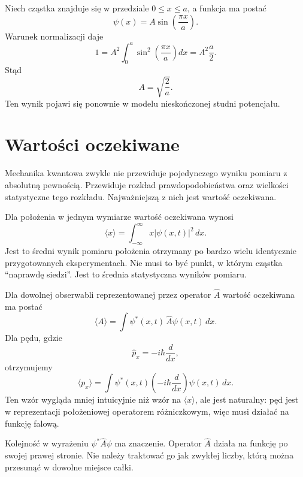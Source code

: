 \begin{examplebox}
Niech cząstka znajduje się w przedziale \(0\leq x\leq a\), a funkcja ma postać
\[
    \psi(x)=A\sin\left(\frac{\pi x}{a}\right).
\]
Warunek normalizacji daje
\[
    1=A^2\int_0^a \sin^2\left(\frac{\pi x}{a}\right)dx
    =A^2\frac{a}{2}.
\]
Stąd
\[
    A=\sqrt{\frac{2}{a}}.
\]
Ten wynik pojawi się ponownie w modelu nieskończonej studni potencjału.
\end{examplebox}

\section{Wartości oczekiwane}

Mechanika kwantowa zwykle nie przewiduje pojedynczego wyniku pomiaru z absolutną pewnością. Przewiduje rozkład prawdopodobieństwa oraz wielkości statystyczne tego rozkładu. Najważniejszą z nich jest wartość oczekiwana.

Dla położenia w jednym wymiarze wartość oczekiwana wynosi
\begin{equation}
    \langle x\rangle=\int_{-\infty}^{\infty} x |\psi(x,t)|^2\,dx.
\end{equation}
Jest to średni wynik pomiaru położenia otrzymany po bardzo wielu identycznie przygotowanych eksperymentach. Nie musi to być punkt, w którym cząstka ``naprawdę siedzi''. Jest to średnia statystyczna wyników pomiaru.

Dla dowolnej obserwabli reprezentowanej przez operator \(\hat{A}\) wartość oczekiwana ma postać
\begin{equation}
    \langle A\rangle
    =\int \psi^*(x,t)\,\hat{A}\psi(x,t)\,dx.
\end{equation}
Dla pędu, gdzie
\[
    \hat{p}_x=-i\hbar\frac{d}{dx},
\]
otrzymujemy
\begin{equation}
    \langle p_x\rangle
    =\int \psi^*(x,t)\left(-i\hbar\frac{d}{dx}\right)\psi(x,t)\,dx.
\end{equation}
Ten wzór wygląda mniej intuicyjnie niż wzór na \(\langle x\rangle\), ale jest naturalny: pęd jest w reprezentacji położeniowej operatorem różniczkowym, więc musi działać na funkcję falową.

\begin{remarkbox}
Kolejność w wyrażeniu \(\psi^*\hat{A}\psi\) ma znaczenie. Operator \(\hat{A}\) działa na funkcję po swojej prawej stronie. Nie należy traktować go jak zwykłej liczby, którą można przesunąć w dowolne miejsce całki.
\end{remarkbox}

